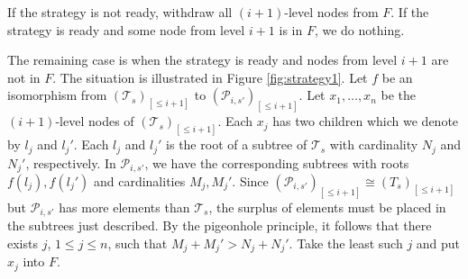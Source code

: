\documentclass[a4paper,UKenglish,cleveref, autoref, thm-restate]{lipics-v2021}
\begin{document}
If the strategy is not ready, withdraw all $(i+1)$-level nodes from $F$. If the strategy is ready and some node from level $i+1$ is in $F$, we do nothing. 

The remaining case is when the strategy is ready and nodes from level $i+1$ are not in $F$. The situation is illustrated in Figure \ref{fig:strategy1}. Let $f$ be an isomorphism from $(\mathcal{T}_{s})_{[\leq i + 1]}$ to $(\mathcal{P}_{i,s'})_{[\leq i + 1]}$. Let $x_1, \dots, x_n$ be the $(i+1)$-level nodes of $(\mathcal{T}_{s})_{[\leq i + 1]}$. Each $x_j$ has two children which we denote by $l_j$ and $l_j'$. Each $l_j$ and $l_j'$ is the root of a subtree of $\mathcal T_s$ with cardinality $N_j$ and $N_j'$, respectively. In $\mathcal P_{i,s'}$, we have the corresponding subtrees with roots $f(l_j), f(l_j')$ and cardinalities $M_j, M_j'$. Since $(\mathcal P_{i,s'})_{[\leq i + 1]}\cong (T_s)_{[\leq i + 1]}$ but $\mathcal P_{i,s'}$ has more elements than $\mathcal T_s$, the surplus of elements must be placed in the subtrees just described. By the pigeonhole principle, it follows that there exists $j$, $1 \leq j \leq n$, such that $M_j + M_j' > N_j + N_j'$. Take the least such $j$ and put $x_j$ into $F$.
\end{document}

